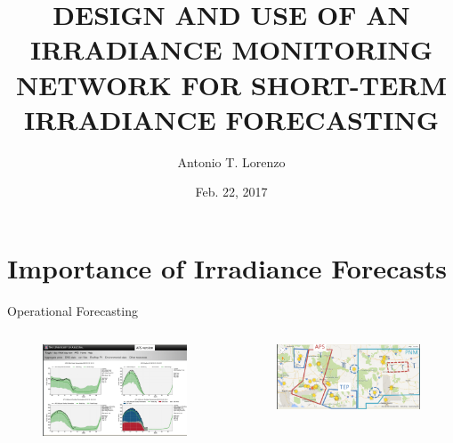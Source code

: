 \documentclass[aspectratio=169]{beamer}
\title[Dissertation Proposal]{DESIGN AND USE OF AN IRRADIANCE
  MONITORING NETWORK FOR SHORT-TERM IRRADIANCE FORECASTING}
\author[Lorenzo]{Antonio T. Lorenzo}
\institute{University of Arizona}
\date{Feb. 22, 2017}
\begin{document}
\begin{frame}
  \titlepage
\end{frame}


\section{Importance of Irradiance Forecasts}
\label{sec:intro}

\begin{frame}{Operational Forecasting}
\begin{columns}
\begin{column}{0.5\textwidth}
\begin{figure}[h]
\centering
\includegraphics[width=\textwidth]{figs/website.png}
\end{figure}
\end{column}
\begin{column}{0.5\textwidth}
\begin{figure}[h]
\includegraphics[width=\textwidth]{figs/utilities.png}
\end{figure}
\end{column}
\end{columns}
\end{frame}
\end{document}
